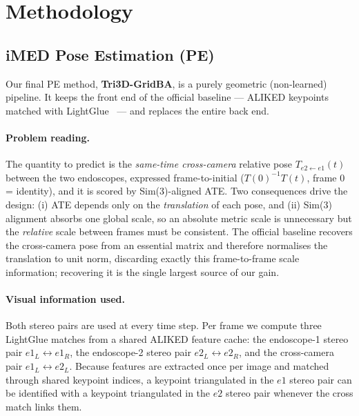 \section{Methodology}

%

\subsection{iMED Pose Estimation (PE)}

Our final PE method, \textbf{Tri3D-GridBA}, is a purely geometric (non-learned) pipeline. It keeps the
front end of the official baseline --- ALIKED keypoints~\cite{zhao2023aliked} matched with
LightGlue~\cite{lindenberger2023lightglue} --- and replaces the entire back end.

\paragraph{Problem reading.} The quantity to predict is the \emph{same-time cross-camera} relative pose
$T_{e2\leftarrow e1}(t)$ between the two endoscopes, expressed frame-to-initial
($T(0)^{-1}T(t)$, frame $0$ = identity), and it is scored by Sim(3)-aligned ATE. Two consequences drive
the design: (i) ATE depends only on the \emph{translation} of each pose, and (ii) Sim(3) alignment absorbs
one global scale, so an absolute metric scale is unnecessary but the \emph{relative} scale between frames
must be consistent. The official baseline recovers the cross-camera pose from an essential matrix and
therefore normalises the translation to unit norm, discarding exactly this frame-to-frame scale
information; recovering it is the single largest source of our gain.

\paragraph{Visual information used.} Both stereo pairs are used at every time step. Per frame we compute
three LightGlue matches from a shared ALIKED feature cache: the endoscope-1 stereo pair
$e1_L\!\leftrightarrow\!e1_R$, the endoscope-2 stereo pair $e2_L\!\leftrightarrow\!e2_R$, and the
cross-camera pair $e1_L\!\leftrightarrow\!e2_L$. Because features are extracted once per image and matched
through shared keypoint indices, a keypoint triangulated in the $e1$ stereo pair can be identified with a
keypoint triangulated in the $e2$ stereo pair whenever the cross match links them.

